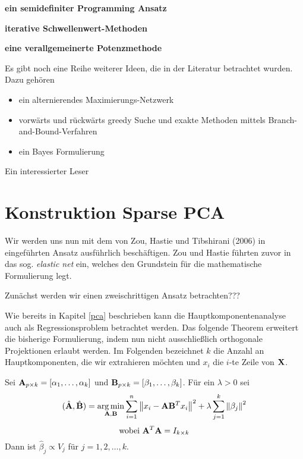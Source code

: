 \textbf{ein semidefiniter Programming Ansatz}

\textbf{iterative Schwellenwert-Methoden}

\textbf{eine verallgemeinerte Potenzmethode}

Es gibt noch eine Reihe weiterer Ideen, die in der Literatur betrachtet wurden. Dazu gehören
\begin{itemize}
\item ein alternierendes Maximierungs-Netzwerk \cite{richtarik}
\item vorwärts und rückwärts greedy Suche und exakte Methoden mittels Branch-and-Bound-Verfahren \cite{moghaddam}
\item ein Bayes Formulierung \cite{guan}
\end{itemize}

Ein interessierter Leser 




\section{Konstruktion Sparse PCA} \label{construction}

Wir werden uns nun mit dem von Zou, Hastie und Tibshirani (2006) in \cite{zou_sparsepca} eingeführten Ansatz ausführlich beschäftigen. Zou und Hastie führten zuvor in \cite{zou_elasticnet} das sog. \textit{elastic net} ein, welches den Grundstein für die mathematische Formulierung legt.

Zunächst werden wir einen zweischrittigen Ansatz betrachten???

Wie bereits in Kapitel \ref{pca} beschrieben kann die Hauptkomponentenanalyse auch als Regressionsproblem betrachtet werden. Das folgende Theorem erweitert die bisherige Formulierung, indem nun nicht ausschließlich orthogonale Projektionen erlaubt werden. 
Im Folgenden bezeichnet $k$ die Anzahl an Hauptkomponenten, die wir extrahieren möchten und $x_i$ die $i$-te Zeile von $\mathbf{X}$.

\begin{thm} \label{pca_regression_formulation_ridge}
Sei $\mathbf{A}_{p \times k} = [ \alpha_1, \ldots ,\alpha_k ]$ und $\mathbf{B}_{p \times k} = [ \beta_1, \ldots ,\beta_k ]$. Für ein $\lambda > 0$ sei
$$(\hat{\mathbf{A}}, \hat{\mathbf{B}}) = \operatorname*{arg\,min}_{\mathbf{A}, \mathbf{B}} \sum_{i=1}^{n} \left\lVert x_i - \mathbf{A}\mathbf{B}^Tx_i \right\rVert^2 + \lambda \sum_{j=1}^{k}\left\lVert \beta_j \right\rVert^2$$
$$\text{wobei } \mathbf{A}^T\mathbf{A} = I_{k \times k}$$
Dann ist $\hat{\beta}_j \propto V_j$ für $j = 1,2,\ldots,k$. 
\end{thm}

